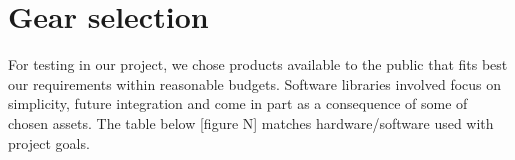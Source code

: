 


\section{Gear selection}
For testing in our project, we chose products available to the public that fits best our requirements within reasonable budgets. Software libraries involved focus on simplicity, future integration and come in part as a consequence of some of chosen assets. The table below [figure N] matches hardware/software used with project goals.
\iffalse
\subsection{HMD and head tracking}

\subsection{Camera for stereo}
low cost
best resolution/fps rate

\subsection{3D Engine for VR environment}
OculusSDK
Ogre3D

\subsection{Libraries for CV and AR}
OpenCV + tbb + cuda
arUco
\fi

